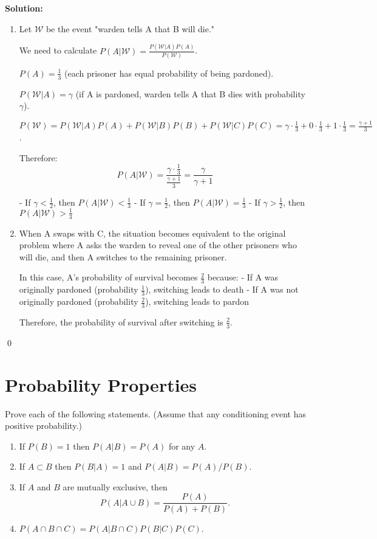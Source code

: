 \noindent\textbf{Solution:}
\begin{enumerate}[label=(\alph*)]
    \item Let $\mathcal{W}$ be the event "warden tells A that B will die."
    
    We need to calculate $P(A|\mathcal{W}) = \frac{P(\mathcal{W}|A)P(A)}{P(\mathcal{W})}$.
    
    $P(A) = \frac{1}{3}$ (each prisoner has equal probability of being pardoned).
    
    $P(\mathcal{W}|A) = \gamma$ (if A is pardoned, warden tells A that B dies with probability $\gamma$).
    
    $P(\mathcal{W}) = P(\mathcal{W}|A)P(A) + P(\mathcal{W}|B)P(B) + P(\mathcal{W}|C)P(C) = \gamma \cdot \frac{1}{3} + 0 \cdot \frac{1}{3} + 1 \cdot \frac{1}{3} = \frac{\gamma + 1}{3}$.
    
    Therefore:
    \[ P(A|\mathcal{W}) = \frac{\gamma \cdot \frac{1}{3}}{\frac{\gamma + 1}{3}} = \frac{\gamma}{\gamma + 1} \]
    
    - If $\gamma < \frac{1}{2}$, then $P(A|\mathcal{W}) < \frac{1}{3}$
    - If $\gamma = \frac{1}{2}$, then $P(A|\mathcal{W}) = \frac{1}{3}$
    - If $\gamma > \frac{1}{2}$, then $P(A|\mathcal{W}) > \frac{1}{3}$
    
    \item When A swaps with C, the situation becomes equivalent to the original problem where A asks the warden to reveal one of the other prisoners who will die, and then A switches to the remaining prisoner.
    
    In this case, A's probability of survival becomes $\frac{2}{3}$ because:
    - If A was originally pardoned (probability $\frac{1}{3}$), switching leads to death
    - If A was not originally pardoned (probability $\frac{2}{3}$), switching leads to pardon
    
    Therefore, the probability of survival after switching is $\frac{2}{3}$.
\end{enumerate}



\qed
\section{Probability Properties}

\begin{problembox}
Prove each of the following statements. (Assume that any conditioning event has positive probability.)
\begin{enumerate}[label=(\alph*)]
    \item If $P(B)=1$ then $P(A|B)=P(A)$ for any $A$.
    \item If $A\subset B$ then $P(B|A)=1$ and $P(A|B)=P(A)/P(B)$.
    \item If $A$ and $B$ are mutually exclusive, then
    \[ P(A|A\cup B)=\frac{P(A)}{P(A)+P(B)}. \]
    \item $P(A\cap B\cap C)=P(A|B\cap C)P(B|C)P(C)$.
\end{enumerate}
\end{problembox}

